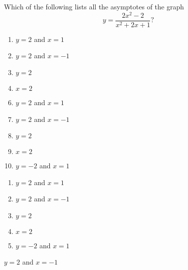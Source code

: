 

 Which of the following lists all the asymptotes of the graph
\[y = \frac{2x^2-2}{x^2+2x+1}?\]


\ifsat
	\begin{enumerate}[label=\Alph*)]
		\item   $y=2$ and $x = 1$
		\item $y=2$ and $x = -1$%
		\item  $y=2$
		\item  $x=2$
	\end{enumerate}
\else
\fi

\ifacteven
	\begin{enumerate}[label=\textbf{\Alph*.},itemsep=\fill,align=left]
		\setcounter{enumii}{5}
		\item   $y=2$ and $x = 1$
		\item $y=2$ and $x = -1$%
		\item  $y=2$
		\addtocounter{enumii}{1}
		\item  $x=2$
		\item   $y=-2$ and $x = 1$
	\end{enumerate}
\else
\fi

\ifactodd
	\begin{enumerate}[label=\textbf{\Alph*.},itemsep=\fill,align=left]
		\item   $y=2$ and $x = 1$
		\item $y=2$ and $x = -1$%
		\item  $y=2$
		\item  $x=2$
		\item   $y=-2$ and $x = 1$
	\end{enumerate}
\else
\fi

\ifgridin
 $y=2$ and $x = -1$%
		
\else
\fi

